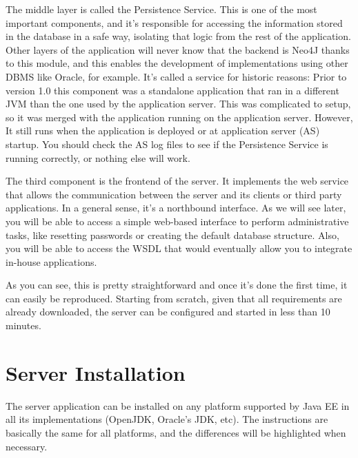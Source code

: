 \documentclass[a4paper]{article}
\begin{document}
		The middle layer is called the Persistence Service. This is one of the most important components, and it's responsible for accessing the information stored in the database in a safe way, isolating that logic from the rest of the application. Other layers of the application will never know that the backend is Neo4J thanks to this module, and this enables the development of implementations using other DBMS like Oracle, for example. It's called a service for historic reasons: Prior to version 1.0 this component was a standalone application that ran in a different JVM than the one used by the application server. This was complicated to setup, so it was merged with the application running on the application server. However, It still runs when the application is deployed or at application server (AS) startup. You should check the AS log files to see if the Persistence Service is running correctly, or nothing else will work.\newline
		
		The third component is the frontend of the server. It implements the web service that allows the communication between the server and its clients or third party applications. In a general sense, it's a northbound interface. As we will see later, you will be able to access a simple web-based interface to perform administrative tasks, like resetting passwords or creating the default database structure. Also, you will be able to access the WSDL that would eventually allow you to integrate in-house applications.\newline
		
		As you can see, this is pretty straightforward and once it's done the first time, it can easily be reproduced. Starting from scratch, given that all requirements are already downloaded, the server can be configured and started in less than 10 minutes.
	\newpage
	
	\section{Server Installation}
		The server application can be installed on any platform supported by Java EE in all its implementations (OpenJDK, Oracle's JDK, etc). The instructions are basically the same for all platforms, and the differences will be highlighted when necessary.
\end{document}
